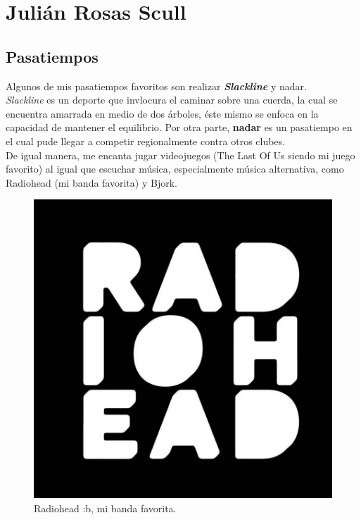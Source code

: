 \chapter{Julián Rosas Scull}
\section{Pasatiempos}

\large
Algunos de mis pasatiempos favoritos son realizar \textbf{\textit{Slackline}} y nadar.
\\

\textit{Slackline} es un deporte que invlocura el caminar sobre una cuerda, la cual se encuentra amarrada en medio de dos árboles, éste mismo se enfoca en
la capacidad de mantener el equilibrio. Por otra parte, \textbf{nadar} es un pasatiempo en el cual pude llegar a competir regionalmente contra otros clubes.
\\

De igual manera, me encanta jugar videojuegos (The Last Of Us siendo mi juego favorito) al igual que escuchar música, especialmente música alternativa,
como Radiohead (mi banda favorita) y Bjork.
\\

\begin{figure}[H]
  \centering
  \includegraphics[scale=0.1]{Julian/radiohead.jpg}
  \caption{Radiohead :b, mi banda favorita.}
  \label{radiohead}
\end{figure}

